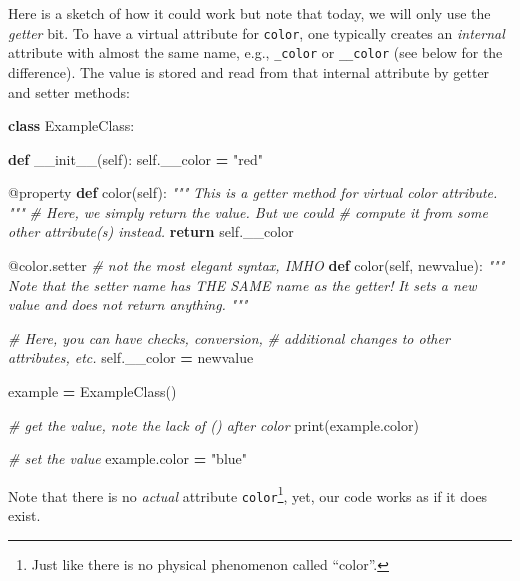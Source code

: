 \documentclass[
]{book}
\newenvironment{Shaded}{\begin{snugshade}}{\end{snugshade}}
\newcommand{\AttributeTok}[1]{\textcolor[rgb]{0.77,0.63,0.00}{#1}}
\newcommand{\BuiltInTok}[1]{#1}
\newcommand{\CommentTok}[1]{\textcolor[rgb]{0.56,0.35,0.01}{\textit{#1}}}
\newcommand{\ControlFlowTok}[1]{\textcolor[rgb]{0.13,0.29,0.53}{\textbf{#1}}}
\newcommand{\FunctionTok}[1]{\textcolor[rgb]{0.00,0.00,0.00}{#1}}
\newcommand{\KeywordTok}[1]{\textcolor[rgb]{0.13,0.29,0.53}{\textbf{#1}}}
\newcommand{\NormalTok}[1]{#1}
\newcommand{\OperatorTok}[1]{\textcolor[rgb]{0.81,0.36,0.00}{\textbf{#1}}}
\newcommand{\StringTok}[1]{\textcolor[rgb]{0.31,0.60,0.02}{#1}}
\newcommand{\VariableTok}[1]{\textcolor[rgb]{0.00,0.00,0.00}{#1}}
\begin{document}
Here is a sketch of how it could work but note that today, we will only use the \emph{getter} bit. To have a virtual attribute for \texttt{color}, one typically creates an \emph{internal} attribute with almost the same name, e.g., \texttt{\_color} or \texttt{\_\_color} (see below for the difference). The value is stored and read from that internal attribute by getter and setter methods:

\begin{Shaded}
\begin{Highlighting}[]
\KeywordTok{class}\NormalTok{ ExampleClass:}

  \KeywordTok{def} \FunctionTok{\_\_init\_\_}\NormalTok{(}\VariableTok{self}\NormalTok{):}
    \VariableTok{self}\NormalTok{.\_\_color }\OperatorTok{=} \StringTok{"red"}

  \AttributeTok{@property}
  \KeywordTok{def}\NormalTok{ color(}\VariableTok{self}\NormalTok{):}
    \CommentTok{"""}
\CommentTok{    This is a getter method for virtual color}
\CommentTok{    attribute.}
\CommentTok{    """}
    \CommentTok{\# Here, we simply return the value. But we could }
    \CommentTok{\# compute it from some other attribute(s) instead.}
    \ControlFlowTok{return} \VariableTok{self}\NormalTok{.\_\_color}
    
  \AttributeTok{@color.setter} \CommentTok{\# not the most elegant syntax, IMHO}
  \KeywordTok{def}\NormalTok{ color(}\VariableTok{self}\NormalTok{, newvalue):}
    \CommentTok{"""}
\CommentTok{    Note that the setter name has THE SAME name as the getter!}
\CommentTok{    It sets a new value and does not return anything.}
\CommentTok{    """}
  
    \CommentTok{\# Here, you can have checks, conversion, }
    \CommentTok{\# additional changes to other attributes, etc.}
    \VariableTok{self}\NormalTok{.\_\_color }\OperatorTok{=}\NormalTok{ newvalue}
    
    
\NormalTok{example }\OperatorTok{=}\NormalTok{ ExampleClass()}

\CommentTok{\# get the value, note the lack of () after color}
\BuiltInTok{print}\NormalTok{(example.color)}

\CommentTok{\# set the value}
\NormalTok{example.color }\OperatorTok{=} \StringTok{"blue"}
\end{Highlighting}
\end{Shaded}

Note that there is no \emph{actual} attribute \texttt{color}\footnote{Just like there is no physical phenomenon called ``color''.}, yet, our code works as if it does exist.
\end{document}
